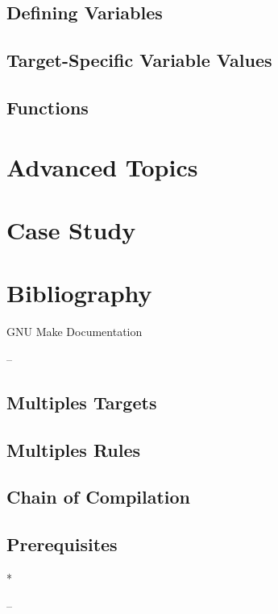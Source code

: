 
\subsection{Defining Variables}


\subsection{Target-Specific Variable Values}


\subsection{Functions}


\section{Advanced Topics}

\section{Case Study}

%
%

\section{Bibliography}

\begin{thebibliography}{3}
    GNU Make Documentation
\end{thebibliography}



--

\subsection{Multiples Targets}
\subsection{Multiples Rules}
\subsection{Chain of Compilation}
\subsection{Prerequisites} *

--

